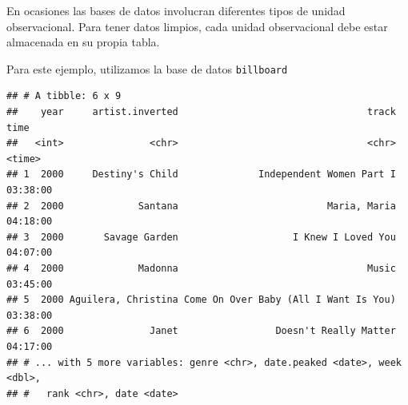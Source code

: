 \documentclass[]{article}
\newenvironment{Shaded}{\begin{snugshade}}{\end{snugshade}}
\newcommand{\KeywordTok}[1]{\textcolor[rgb]{0.13,0.29,0.53}{\textbf{#1}}}
\newcommand{\DataTypeTok}[1]{\textcolor[rgb]{0.13,0.29,0.53}{#1}}
\newcommand{\DecValTok}[1]{\textcolor[rgb]{0.00,0.00,0.81}{#1}}
\newcommand{\StringTok}[1]{\textcolor[rgb]{0.31,0.60,0.02}{#1}}
\newcommand{\OtherTok}[1]{\textcolor[rgb]{0.56,0.35,0.01}{#1}}
\newcommand{\OperatorTok}[1]{\textcolor[rgb]{0.81,0.36,0.00}{\textbf{#1}}}
\newcommand{\NormalTok}[1]{#1}
\begin{document}
En ocasiones las bases de datos involucran diferentes tipos de unidad
observacional. Para tener datos limpios, cada unidad observacional debe
estar almacenada en su propia tabla.

Para este ejemplo, utilizamos la base de datos \texttt{billboard}
\parencite[][archivo: data/billboard.csv]{tidydata}

\begin{Shaded}
\end{Shaded}

\begin{verbatim}
## # A tibble: 6 x 9
##    year     artist.inverted                                 track     time
##   <int>               <chr>                                 <chr>   <time>
## 1  2000     Destiny's Child              Independent Women Part I 03:38:00
## 2  2000             Santana                          Maria, Maria 04:18:00
## 3  2000       Savage Garden                    I Knew I Loved You 04:07:00
## 4  2000             Madonna                                 Music 03:45:00
## 5  2000 Aguilera, Christina Come On Over Baby (All I Want Is You) 03:38:00
## 6  2000               Janet                 Doesn't Really Matter 04:17:00
## # ... with 5 more variables: genre <chr>, date.peaked <date>, week <dbl>,
## #   rank <chr>, date <date>
\end{verbatim}

\renewcommand\bcStyleTitre[1]{\large\textcolor{bbblack}{#1}}
\end{document}
